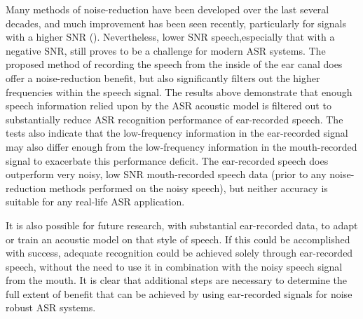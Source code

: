 Many methods of noise-reduction have been developed over the last several decades, and much improvement has been seen recently, particularly for signals with a higher SNR (\cite{zhang:17}).  Nevertheless, lower SNR speech,especially that with a negative SNR, still proves to be a challenge for modern ASR systems.  The proposed method of recording the speech from the inside of the ear canal does offer a noise-reduction benefit, but also significantly filters out the higher frequencies within the speech signal.  The results above demonstrate that enough speech information relied upon by the ASR acoustic model is filtered out to substantially reduce ASR recognition performance of ear-recorded speech.  The tests also indicate that the low-frequency information in the ear-recorded signal may also differ enough from the low-frequency information in the mouth-recorded signal to exacerbate this performance deficit.  The ear-recorded speech does outperform very noisy, low SNR mouth-recorded speech data (prior to any noise-reduction methods performed on the noisy speech), but neither  accuracy is suitable for any real-life ASR application.  


It is also possible for future research, with substantial ear-recorded data, to adapt or train an acoustic model on that style of speech.  If this could be accomplished with success, adequate recognition could be achieved solely through ear-recorded speech, without the need to use it in combination with the noisy speech signal from the mouth.  It is clear that additional steps are necessary to determine the full extent of benefit that can be achieved by using ear-recorded signals for noise robust ASR systems.




